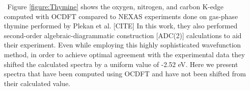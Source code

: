 \documentclass[11.5pt]{article}
\begin{document}

 \ Figure \ref{figure:Thymine} shows the oxygen, nitrogen, and carbon K-edge computed with OCDFT compared to NEXAS experiments done on gas-phase thymine performed by Plekan et al. [CITE] In this work, they also performed second-order algebraic-diagrammatic construction [ADC(2)] calculations to aid their experiment. Even while employing this highly sophisticated wavefunction method, in order to achieve optimal agreement with the experimental data they shifted the calculated spectra by a uniform value of -2.52 eV. Here we present spectra that have been computed using OCDFT and have not been shifted from their calculated value.
\end{document}
